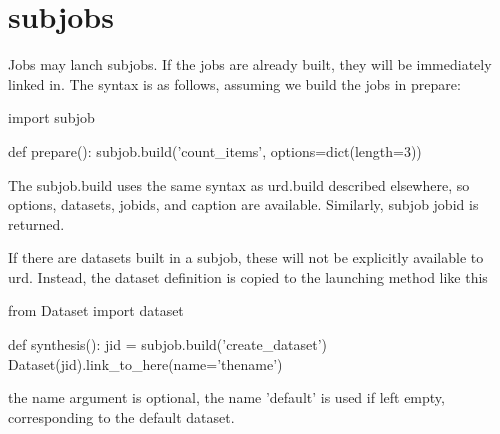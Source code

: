 \newpage
\section{subjobs}

Jobs may lanch subjobs.  If the jobs are already built, they will be
immediately linked in.  The syntax is as follows, assuming we build
the jobs in prepare:

\begin{python}
import subjob

def prepare():
  subjob.build('count_items', options=dict(length=3))
\end{python}
The subjob.build uses the same syntax as urd.build described
elsewhere, so options, datasets, jobids, and caption are available.
Similarly, subjob jobid is returned.

If there are datasets built in a subjob, these will not be explicitly
available to urd.  Instead, the dataset definition is copied to the
launching method like this

\begin{python}
from Dataset import dataset

def synthesis():
  jid = subjob.build('create_dataset')
  Dataset(jid).link_to_here(name='thename')
\end{python}
the name argument is optional, the name 'default' is used if left
empty, corresponding to the default dataset.
